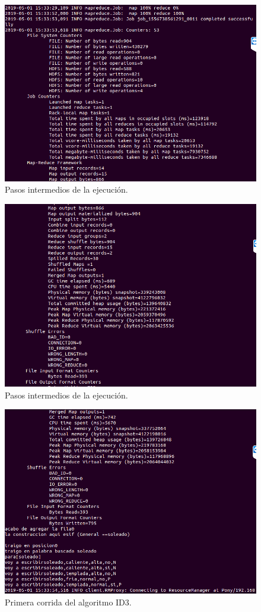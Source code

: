 \begin{figure}[H]
	\begin{center}
		\hypertarget{fig:ID32}{\hspace{1pt}}
		\includegraphics[width=.7\textwidth]{capitulo4a/images/ID3_2.png}
		\caption{Pasos intermedios de la ejecución.}
		\label{fig:ID32}
	\end{center}
\end{figure}
\begin{figure}[H]
	\begin{center}
		\hypertarget{fig:ID33}{\hspace{1pt}}
		\includegraphics[width=.7\textwidth]{capitulo4a/images/ID3_3.png}
		\caption{Pasos intermedios de la ejecución.}
		\label{fig:ID33}
	\end{center}
\end{figure} 
\begin{figure}[H]
	\begin{center}
		\hypertarget{fig:ID31}{\hspace{1pt}}
		\includegraphics[width=.7\textwidth]{capitulo4a/images/ID3_4.png}
		\caption{Primera corrida del algoritmo ID3.}
		\label{fig:ID34}
	\end{center}
\end{figure}
